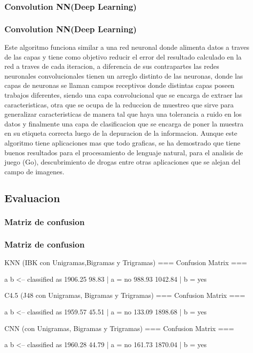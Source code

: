 \documentclass{beamer}
\begin{document}
\subsubsection{Convolution NN(Deep Learning)}
\begin{frame}
\frametitle{Convolution NN(Deep Learning)}
Este algoritmo funciona similar a una red neuronal donde alimenta datos a traves de las capas y tiene como objetivo reducir el error del resultado calculado en la red a traves de cada iteracion, a diferencia de sus contrapartes las redes neuronales convolucionales tienen un arreglo distinto de las neuronas, donde las capas de neuronas se llaman campos receptivos donde distintas capas poseen trabajos diferentes, siendo una capa convolucional que se encarga de extraer las caracteristicas, otra que se ocupa de la reduccion de muestreo que sirve para generalizar caracteristicas de manera tal que haya una tolerancia a ruido en los datos y finalmente una capa de clasificacion que se encarga de poner la muestra en su etiqueta correcta luego de la depuracion de la informacion. Aunque este algoritmo tiene aplicaciones mas que todo graficas, se ha demostrado que tiene buenos resultados para el procesamiento de lenguaje natural, para el analisis de juego (Go), descubrimiento de drogas entre otras aplicaciones que se alejan del campo de imagenes.
\end{frame}
\subsection{Evaluacion}
\subsubsection{Matriz de confusion}
\begin{frame}
\frametitle{Matriz de confusion}
KNN (IBK con Unigramas,Bigramas y Trigramas)
=== Confusion Matrix ===

    a       b      <-- classified as
 1906.25   98.83 |       a = no
  988.93 1042.84 |       b = yes

C4.5 (J48 con Unigramas, Bigramas y Trigramas)
=== Confusion Matrix ===

    a       b      <-- classified as
 1959.57   45.51 |       a = no
  133.09 1898.68 |       b = yes

CNN (con Unigramas, Bigramas y Trigramas)
=== Confusion Matrix ===

    a       b      <-- classified as
 1960.28   44.79 |       a = no
  161.73 1870.04 |       b = yes


\end{frame}
\end{document}
